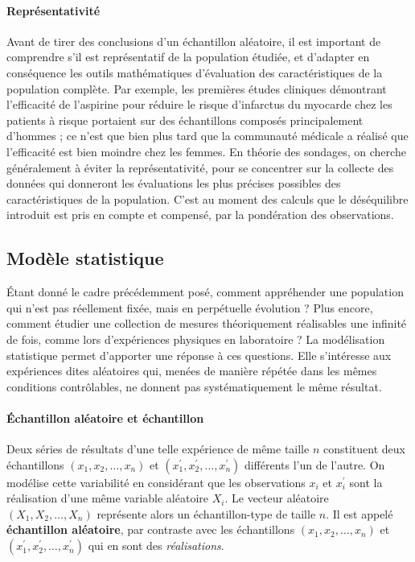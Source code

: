 \paragraph{Représentativité} Avant de tirer des conclusions d'un échantillon
aléatoire, il est important de comprendre s'il est représentatif de la
population étudiée, et d'adapter en conséquence les outils mathématiques d'évaluation des caractéristiques de la population complète. Par exemple, les premières études cliniques démontrant
l'efficacité de l'aspirine pour réduire le risque d'infarctus du myocarde chez
les patients à risque portaient sur des échantillons composés principalement
d'hommes ; ce n'est que bien plus tard que la communauté médicale a réalisé que
l'efficacité est bien moindre chez les femmes. 
En théorie des sondages, on cherche généralement à éviter la représentativité, pour se concentrer sur la collecte des données qui donneront les évaluations les plus précises possibles des caractéristiques de la population. C'est au moment des calculs que le déséquilibre introduit est pris en compte et compensé, par la pondération des observations.

\subsection{Modèle statistique}

{\'E}tant donné le cadre précédemment posé, comment appréhender une population qui n'est pas réellement fixée, mais en perpétuelle évolution ? Plus encore, comment étudier une collection de mesures théoriquement réalisables une infinité de fois, comme lors d'expériences physiques en laboratoire ? 
La modélisation statistique permet d'apporter une réponse à ces questions. Elle s'intéresse aux expériences dites aléatoires qui, menées de manière répétée dans les mêmes conditions contrôlables, ne donnent pas systématiquement le même résultat.

\paragraph{Échantillon aléatoire et échantillon} Deux séries de résultats d'une telle expérience de même taille $n$ constituent deux échantillons $(x_1, x_2, \dots, x_n)$ et $(x^\prime_1, x^\prime_2, \dots, x^\prime_n)$ différents l'un de l'autre. On modélise cette variabilité en
considérant que les observations $x_i$ et $x^\prime_i$ sont la réalisation
d'une même variable aléatoire $X_i$. Le vecteur aléatoire $(X_1, X_2, \dots, X_n)$ représente alors un échantillon-type de taille $n$. Il est appelé \textbf{échantillon aléatoire}, par contraste avec les échantillons $(x_1, x_2, \dots, x_n)$ et $(x^\prime_1, x^\prime_2, \dots, x^\prime_n)$ qui en sont des \textit{réalisations}.

